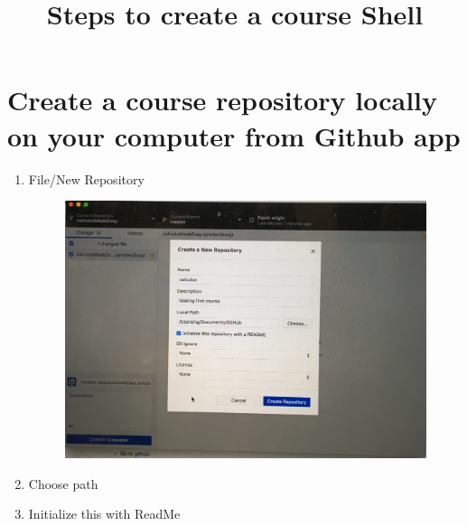 \documentclass{ximera}
\title{Steps to create a course Shell }
\begin{document}
\begin{abstract}
\end{abstract}
\maketitle

\section{Create a course repository locally on your computer from Github app}
\begin{enumerate}
\item File/New Repository
\begin{center}
\begin{figure}[h]
\includegraphics[scale=.1]{images/x1}
\end{figure}
\end{center}
\item	Choose path
\item Initialize this with ReadMe
\end{enumerate}
\end{document}
